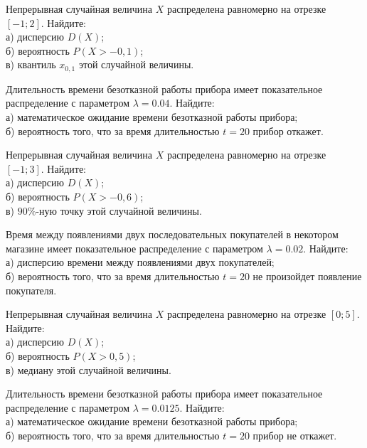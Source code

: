 \vfill

\newpage\setcounter{zad}{0}

\z Непрерывная случайная величина $X$ распределена равномерно на отрезке $[-1; 2]$. Найдите: \\ \quad а) дисперсию $D(X)$; \\ \quad б) вероятность $P(X>-0{,}1)$; \\ \quad в) квантиль $x_{0{,}1}$ этой случайной величины.


\vfill

\z Длительность времени безотказной работы прибора имеет показательное распределение с параметром $\lambda = 0.04$. Найдите: \\ \quad а) математическое ожидание времени безотказной работы прибора; \\ \quad б) вероятность того, что за время длительностью $t = 20$ прибор  откажет.
 

\vfill

\newpage\setcounter{zad}{0}

\z Непрерывная случайная величина $X$ распределена равномерно на отрезке $[-1; 3]$. Найдите: \\ \quad а) дисперсию $D(X)$; \\ \quad б) вероятность $P(X>-0{,}6)$; \\ \quad в) $90\%$-ную точку этой случайной величины.


\vfill

\z Время между появлениями двух последовательных покупателей в некотором магазине имеет показательное распределение с параметром $\lambda = 0.02$. Найдите: \\ \quad а) дисперсию времени между появлениями двух покупателей; \\ \quad б) вероятность того, что за время длительностью $t = 20$ не произойдет появление покупателя.
 

\vfill

\newpage\setcounter{zad}{0}

\z Непрерывная случайная величина $X$ распределена равномерно на отрезке $[0; 5]$. Найдите: \\ \quad а) дисперсию $D(X)$; \\ \quad б) вероятность $P(X>0{,}5)$; \\ \quad в) медиану этой случайной величины.


\vfill

\z Длительность времени безотказной работы прибора имеет показательное распределение с параметром $\lambda = 0.0125$. Найдите: \\ \quad а) математическое ожидание времени безотказной работы прибора; \\ \quad б) вероятность того, что за время длительностью $t = 20$ прибор не откажет.
 

